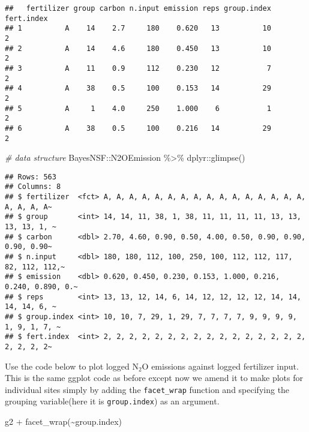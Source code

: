 \documentclass[
]{article}
\newenvironment{Shaded}{\begin{snugshade}}{\end{snugshade}}
\newcommand{\CommentTok}[1]{\textcolor[rgb]{0.56,0.35,0.01}{\textit{#1}}}
\newcommand{\FunctionTok}[1]{\textcolor[rgb]{0.00,0.00,0.00}{#1}}
\newcommand{\NormalTok}[1]{#1}
\newcommand{\SpecialCharTok}[1]{\textcolor[rgb]{0.00,0.00,0.00}{#1}}
\begin{document}
\begin{verbatim}
##   fertilizer group carbon n.input emission reps group.index fert.index
## 1          A    14    2.7     180    0.620   13          10          2
## 2          A    14    4.6     180    0.450   13          10          2
## 3          A    11    0.9     112    0.230   12           7          2
## 4          A    38    0.5     100    0.153   14          29          2
## 5          A     1    4.0     250    1.000    6           1          2
## 6          A    38    0.5     100    0.216   14          29          2
\end{verbatim}

\begin{Shaded}
\begin{Highlighting}[]
\CommentTok{\# data structure}
\NormalTok{BayesNSF}\SpecialCharTok{::}\NormalTok{N2OEmission }\SpecialCharTok{\%\textgreater{}\%} 
\NormalTok{  dplyr}\SpecialCharTok{::}\FunctionTok{glimpse}\NormalTok{()}
\end{Highlighting}
\end{Shaded}

\begin{verbatim}
## Rows: 563
## Columns: 8
## $ fertilizer  <fct> A, A, A, A, A, A, A, A, A, A, A, A, A, A, A, A, A, A, A, A~
## $ group       <int> 14, 14, 11, 38, 1, 38, 11, 11, 11, 11, 13, 13, 13, 13, 1, ~
## $ carbon      <dbl> 2.70, 4.60, 0.90, 0.50, 4.00, 0.50, 0.90, 0.90, 0.90, 0.90~
## $ n.input     <dbl> 180, 180, 112, 100, 250, 100, 112, 112, 117, 82, 112, 112,~
## $ emission    <dbl> 0.620, 0.450, 0.230, 0.153, 1.000, 0.216, 0.240, 0.890, 0.~
## $ reps        <int> 13, 13, 12, 14, 6, 14, 12, 12, 12, 12, 14, 14, 14, 14, 6, ~
## $ group.index <int> 10, 10, 7, 29, 1, 29, 7, 7, 7, 7, 9, 9, 9, 9, 1, 9, 1, 7, ~
## $ fert.index  <int> 2, 2, 2, 2, 2, 2, 2, 2, 2, 2, 2, 2, 2, 2, 2, 2, 2, 2, 2, 2~
\end{verbatim}

Use the code below to plot logged \(\textrm{N} _2 \textrm{O}\) emissions
against logged fertilizer input. This is the same ggplot code as before
except now we amend it to make plots for individual sites simply by
adding the \texttt{facet\_wrap} function and specifying the grouping
variable(here it is \texttt{group.index}) as an argument.

\begin{Shaded}
\begin{Highlighting}[]
\NormalTok{g2 }\SpecialCharTok{+} \FunctionTok{facet\_wrap}\NormalTok{(}\SpecialCharTok{\textasciitilde{}}\NormalTok{group.index)}
\end{Highlighting}
\end{Shaded}
\end{document}
